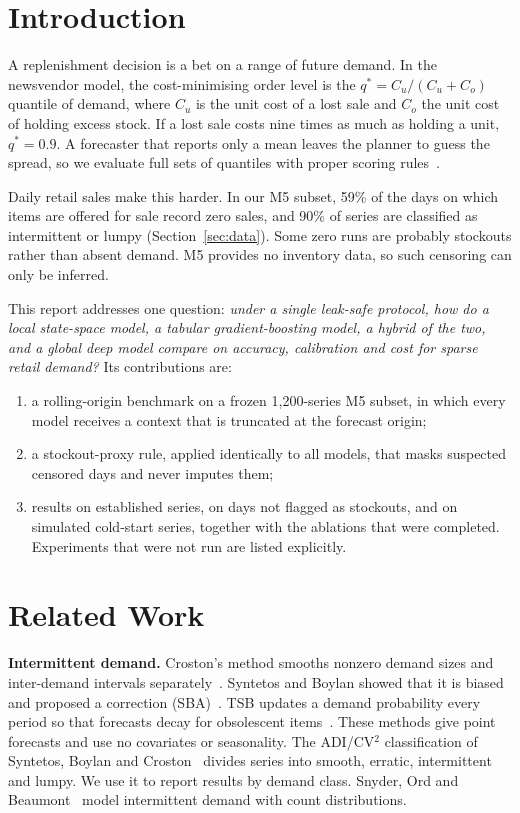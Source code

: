 \documentclass[conference]{IEEEtran}
\begin{document}
\section{Introduction}
A replenishment decision is a bet on a range of future demand. In the newsvendor model, the cost-minimising order level is the $q^{*}=C_u/(C_u+C_o)$ quantile of demand, where $C_u$ is the unit cost of a lost sale and $C_o$ the unit cost of holding excess stock. If a lost sale costs nine times as much as holding a unit, $q^{*}=0.9$. A forecaster that reports only a mean leaves the planner to guess the spread, so we evaluate full sets of quantiles with proper scoring rules~\cite{gneiting2007}.

Daily retail sales make this harder. In our M5 subset, 59\% of the days on which items are offered for sale record zero sales, and 90\% of series are classified as intermittent or lumpy (Section~\ref{sec:data}). Some zero runs are probably stockouts rather than absent demand. M5 provides no inventory data, so such censoring can only be inferred.

This report addresses one question: \emph{under a single leak-safe protocol, how do a local state-space model, a tabular gradient-boosting model, a hybrid of the two, and a global deep model compare on accuracy, calibration and cost for sparse retail demand?} Its contributions are:
\begin{enumerate}
\item a rolling-origin benchmark on a frozen 1,200-series M5 subset, in which every model receives a context that is truncated at the forecast origin;
\item a stockout-proxy rule, applied identically to all models, that masks suspected censored days and never imputes them;
\item results on established series, on days not flagged as stockouts, and on simulated cold-start series, together with the ablations that were completed. Experiments that were not run are listed explicitly.
\end{enumerate}

\section{Related Work}
\textbf{Intermittent demand.} Croston's method smooths nonzero demand sizes and inter-demand intervals separately~\cite{croston1972}. Syntetos and Boylan showed that it is biased and proposed a correction (SBA)~\cite{syntetos2005accuracy}. TSB updates a demand probability every period so that forecasts decay for obsolescent items~\cite{teunter2011}. These methods give point forecasts and use no covariates or seasonality. The ADI/CV$^2$ classification of Syntetos, Boylan and Croston~\cite{syntetos2005categorization} divides series into smooth, erratic, intermittent and lumpy. We use it to report results by demand class. Snyder, Ord and Beaumont~\cite{snyder2012} model intermittent demand with count distributions.
\end{document}
